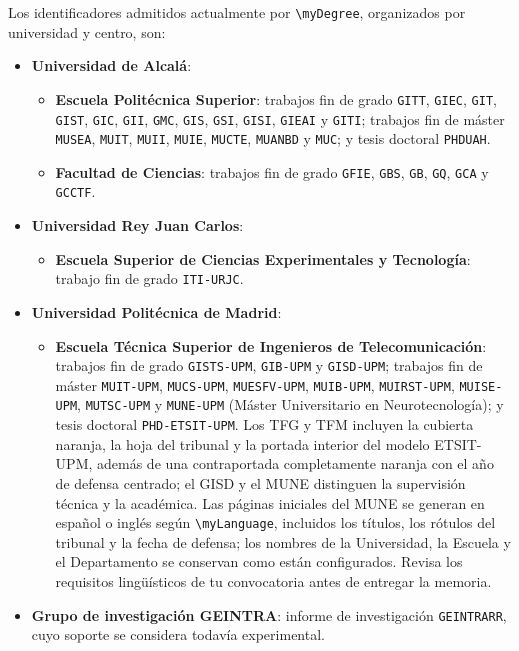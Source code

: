 Los identificadores admitidos actualmente por \texttt{\textbackslash{}myDegree}, organizados por universidad y centro, son:

\begin{itemize}
  \item \textbf{Universidad de Alcalá}:
  \begin{itemize}
    \item \textbf{Escuela Politécnica Superior}: trabajos fin de grado \texttt{GITT}, \texttt{GIEC}, \texttt{GIT}, \texttt{GIST}, \texttt{GIC}, \texttt{GII}, \texttt{GMC}, \texttt{GIS}, \texttt{GSI}, \texttt{GISI}, \texttt{GIEAI} y \texttt{GITI}; trabajos fin de máster \texttt{MUSEA}, \texttt{MUIT}, \texttt{MUII}, \texttt{MUIE}, \texttt{MUCTE}, \texttt{MUANBD} y \texttt{MUC}; y tesis doctoral \texttt{PHDUAH}.
    \item \textbf{Facultad de Ciencias}: trabajos fin de grado \texttt{GFIE}, \texttt{GBS}, \texttt{GB}, \texttt{GQ}, \texttt{GCA} y \texttt{GCCTF}.
  \end{itemize}
  \item \textbf{Universidad Rey Juan Carlos}:
  \begin{itemize}
    \item \textbf{Escuela Superior de Ciencias Experimentales y Tecnología}: trabajo fin de grado \texttt{ITI-URJC}.
  \end{itemize}
  \item \textbf{Universidad Politécnica de Madrid}:
  \begin{itemize}
    \item \textbf{Escuela Técnica Superior de Ingenieros de Telecomunicación}: trabajos fin de grado \texttt{GISTS-UPM}, \texttt{GIB-UPM} y \texttt{GISD-UPM}; trabajos fin de máster \texttt{MUIT-UPM}, \texttt{MUCS-UPM}, \texttt{MUESFV-UPM}, \texttt{MUIB-UPM}, \texttt{MUIRST-UPM}, \texttt{MUISE-UPM}, \texttt{MUTSC-UPM} y \texttt{MUNE-UPM} (Máster Universitario en Neurotecnología); y tesis doctoral \texttt{PHD-ETSIT-UPM}. Los TFG y TFM incluyen la cubierta naranja, la hoja del tribunal y la portada interior del modelo ETSIT-UPM, además de una contraportada completamente naranja con el año de defensa centrado; el GISD y el MUNE distinguen la supervisión técnica y la académica. Las páginas iniciales del MUNE se generan en español o inglés según \texttt{\textbackslash{}myLanguage}, incluidos los títulos, los rótulos del tribunal y la fecha de defensa; los nombres de la Universidad, la Escuela y el Departamento se conservan como están configurados. Revisa los requisitos lingüísticos de tu convocatoria antes de entregar la memoria.
  \end{itemize}
  \item \textbf{Grupo de investigación GEINTRA}: informe de investigación \texttt{GEINTRARR}, cuyo soporte se considera todavía experimental.
\end{itemize}

